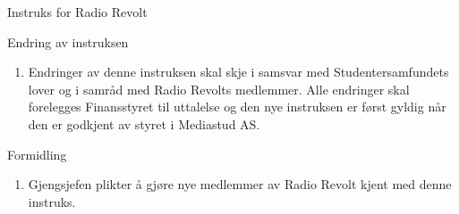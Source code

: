 \documentclass[../fsbok.tex]{subfiles}
\begin{document}
\begin{instruks*}{Instruks for Radio Revolt}
    \begin{instruksledd}{Endring av instruksen}
        \begin{enumerate}
            \item Endringer av denne instruksen skal skje i samsvar med Studentersamfundets
                lover og i samråd med Radio Revolts medlemmer. Alle endringer skal forelegges Finansstyret til
                uttalelse og den nye instruksen er først gyldig når den er godkjent av styret i Mediastud AS.
        \end{enumerate}
    \end{instruksledd}
    
    \begin{instruksledd}{Formidling}
        \begin{enumerate}
            \item Gjengsjefen plikter å gjøre nye medlemmer av Radio Revolt kjent med denne
                instruks.
        \end{enumerate}
    \end{instruksledd}

\end{instruks*}
\end{document}
